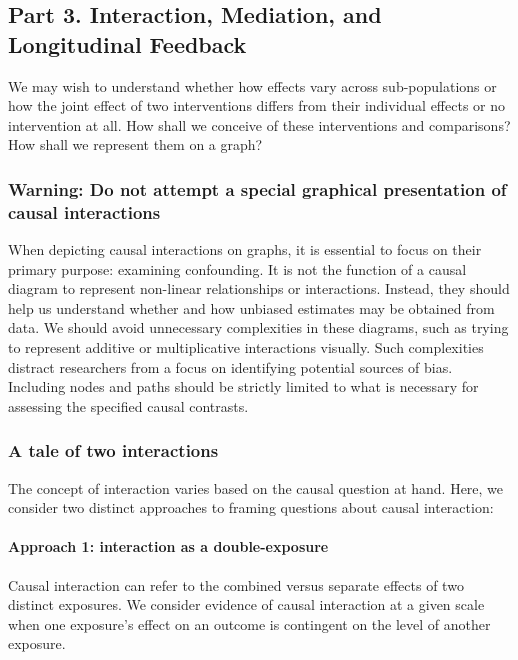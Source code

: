 \documentclass[
  singlecolumn,
  9pt]{article}
\let\oldparagraph\paragraph
\renewcommand{\paragraph}[1]{\oldparagraph{#1}\mbox{}}
\begin{document}
\subsection{Part 3. Interaction, Mediation, and Longitudinal
Feedback}\label{part-3.-interaction-mediation-and-longitudinal-feedback}

We may wish to understand whether how effects vary across
sub-populations or how the joint effect of two interventions differs
from their individual effects or no intervention at all. How shall we
conceive of these interventions and comparisons? How shall we represent
them on a graph?

\subsubsection{Warning: Do not attempt a special graphical presentation
of causal
interactions}\label{warning-do-not-attempt-a-special-graphical-presentation-of-causal-interactions}

When depicting causal interactions on graphs, it is essential to focus
on their primary purpose: examining confounding. It is not the function
of a causal diagram to represent non-linear relationships or
interactions. Instead, they should help us understand whether and how
unbiased estimates may be obtained from data. We should avoid
unnecessary complexities in these diagrams, such as trying to represent
additive or multiplicative interactions visually. Such complexities
distract researchers from a focus on identifying potential sources of
bias. Including nodes and paths should be strictly limited to what is
necessary for assessing the specified causal contrasts.

\subsubsection{A tale of two
interactions}\label{a-tale-of-two-interactions}

The concept of interaction varies based on the causal question at hand.
Here, we consider two distinct approaches to framing questions about
causal interaction:

\paragraph{Approach 1: interaction as a
double-exposure}\label{approach-1-interaction-as-a-double-exposure}

Causal interaction can refer to the combined versus separate effects of
two distinct exposures. We consider evidence of causal interaction at a
given scale when one exposure's effect on an outcome is contingent on
the level of another exposure.
\end{document}
